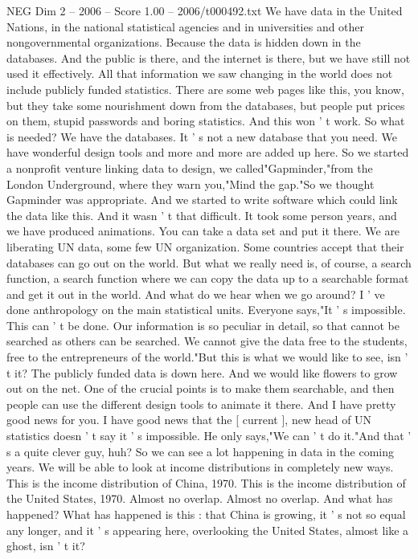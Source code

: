 \begin{textsample}{NEG Dim 2 – 2006 – Score 1.00 – 2006/t000492.txt}
We have data in the United Nations, in the national statistical agencies and in universities and other nongovernmental organizations.
Because the data is hidden down in the databases.
And the public is there, and the internet is there, but we have still not used it effectively.
All that information we saw changing in the world does not include publicly funded statistics.
There are some web pages like this, you know, but they take some nourishment down from the databases, but people put prices on them, stupid passwords and boring statistics.
And this won ' t work.
So what is needed?
We have the databases.
It ' s not a new database that you need.
We have wonderful design tools and more and more are added up here.
So we started a nonprofit venture linking data to design, we called"Gapminder,"from the London Underground, where they warn you,"Mind the gap."So we thought Gapminder was appropriate.
And we started to write software which could link the data like this.
And it wasn ' t that difficult.
It took some person years, and we have produced animations.
You can take a data set and put it there.
We are liberating UN data, some few UN organization.
Some countries accept that their databases can go out on the world.
But what we really need is, of course, a search function, a search function where we can copy the data up to a searchable format and get it out in the world.
And what do we hear when we go around?
I ' ve done anthropology on the main statistical units.
Everyone says,"It ' s impossible.
This can ' t be done.
Our information is so peculiar in detail, so that cannot be searched as others can be searched.
We cannot give the data free to the students, free to the entrepreneurs of the world."But this is what we would like to see, isn ' t it?
The publicly funded data is down here.
And we would like flowers to grow out on the net.
One of the crucial points is to make them searchable, and then people can use the different design tools to animate it there.
And I have pretty good news for you.
I have good news that the [ current ], new head of UN statistics doesn ' t say it ' s impossible.
He only says,"We can ' t do it."And that ' s a quite clever guy, huh?
So we can see a lot happening in data in the coming years.
We will be able to look at income distributions in completely new ways.
This is the income distribution of China, 1970.
This is the income distribution of the United States, 1970.
Almost no overlap.
Almost no overlap.
And what has happened?
What has happened is this : that China is growing, it ' s not so equal any longer, and it ' s appearing here, overlooking the United States, almost like a ghost, isn ' t it?

\end{textsample}
